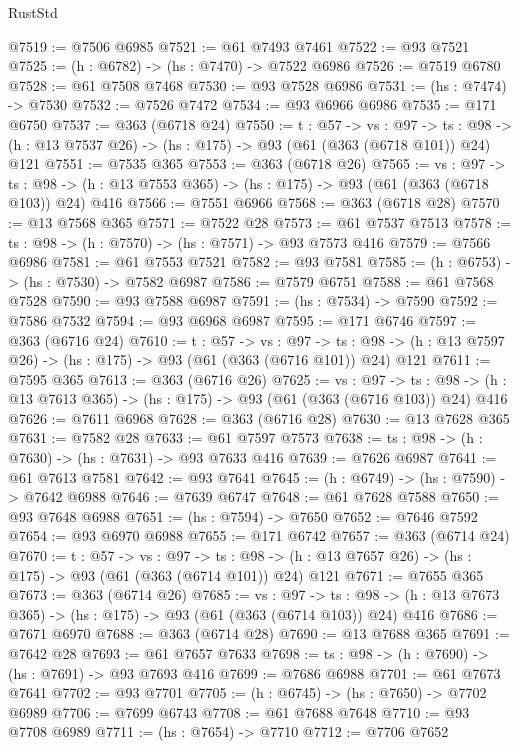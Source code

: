 \begin{lexlean}{RustStd}
\begin{coremodule}
@7519 := @7506 @6985
@7521 := @61 @7493 @7461
@7522 := @93 @7521
@7525 := (h : @6782) -> (hs : @7470) -> @7522 @6986
@7526 := @7519 @6780
@7528 := @61 @7508 @7468
@7530 := @93 @7528 @6986
@7531 := (hs : @7474) -> @7530
@7532 := @7526 @7472
@7534 := @93 @6966 @6986
@7535 := @171 @6750
@7537 := @363 (@6718 @24)
@7550 := {t : @57} ->
  {vs : @97} ->
  {ts : @98} -> (h : @13 @7537 @26) -> (hs : @175) -> @93 (@61 (@363 (@6718 @101)) @24) @121
@7551 := @7535 @365
@7553 := @363 (@6718 @26)
@7565 := {vs : @97} ->
  {ts : @98} -> (h : @13 @7553 @365) -> (hs : @175) -> @93 (@61 (@363 (@6718 @103)) @24) @416
@7566 := @7551 @6966
@7568 := @363 (@6718 @28)
@7570 := @13 @7568 @365
@7571 := @7522 @28
@7573 := @61 @7537 @7513
@7578 := {ts : @98} -> (h : @7570) -> (hs : @7571) -> @93 @7573 @416
@7579 := @7566 @6986
@7581 := @61 @7553 @7521
@7582 := @93 @7581
@7585 := (h : @6753) -> (hs : @7530) -> @7582 @6987
@7586 := @7579 @6751
@7588 := @61 @7568 @7528
@7590 := @93 @7588 @6987
@7591 := (hs : @7534) -> @7590
@7592 := @7586 @7532
@7594 := @93 @6968 @6987
@7595 := @171 @6746
@7597 := @363 (@6716 @24)
@7610 := {t : @57} ->
  {vs : @97} ->
  {ts : @98} -> (h : @13 @7597 @26) -> (hs : @175) -> @93 (@61 (@363 (@6716 @101)) @24) @121
@7611 := @7595 @365
@7613 := @363 (@6716 @26)
@7625 := {vs : @97} ->
  {ts : @98} -> (h : @13 @7613 @365) -> (hs : @175) -> @93 (@61 (@363 (@6716 @103)) @24) @416
@7626 := @7611 @6968
@7628 := @363 (@6716 @28)
@7630 := @13 @7628 @365
@7631 := @7582 @28
@7633 := @61 @7597 @7573
@7638 := {ts : @98} -> (h : @7630) -> (hs : @7631) -> @93 @7633 @416
@7639 := @7626 @6987
@7641 := @61 @7613 @7581
@7642 := @93 @7641
@7645 := (h : @6749) -> (hs : @7590) -> @7642 @6988
@7646 := @7639 @6747
@7648 := @61 @7628 @7588
@7650 := @93 @7648 @6988
@7651 := (hs : @7594) -> @7650
@7652 := @7646 @7592
@7654 := @93 @6970 @6988
@7655 := @171 @6742
@7657 := @363 (@6714 @24)
@7670 := {t : @57} ->
  {vs : @97} ->
  {ts : @98} -> (h : @13 @7657 @26) -> (hs : @175) -> @93 (@61 (@363 (@6714 @101)) @24) @121
@7671 := @7655 @365
@7673 := @363 (@6714 @26)
@7685 := {vs : @97} ->
  {ts : @98} -> (h : @13 @7673 @365) -> (hs : @175) -> @93 (@61 (@363 (@6714 @103)) @24) @416
@7686 := @7671 @6970
@7688 := @363 (@6714 @28)
@7690 := @13 @7688 @365
@7691 := @7642 @28
@7693 := @61 @7657 @7633
@7698 := {ts : @98} -> (h : @7690) -> (hs : @7691) -> @93 @7693 @416
@7699 := @7686 @6988
@7701 := @61 @7673 @7641
@7702 := @93 @7701
@7705 := (h : @6745) -> (hs : @7650) -> @7702 @6989
@7706 := @7699 @6743
@7708 := @61 @7688 @7648
@7710 := @93 @7708 @6989
@7711 := (hs : @7654) -> @7710
@7712 := @7706 @7652

\end{coremodule}
\end{lexlean}
